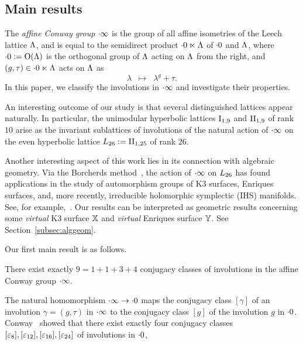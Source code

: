 \documentclass{amsart} %
\begin{document}
\subsection{Main results}
%
The \emph{affine Conway group} $\cdot \infty$ is the group of 
all affine isometries of the Leech lattice $\Lambda$,
and is equal to the semidirect product $\cdot 0 \ltimes \Lambda$
of $\cdot 0$ and $\Lambda$,
where $\cdot 0:=\mathord{\mathrm{O}}(\Lambda)$ is the orthogonal group of $\Lambda$
acting on $\Lambda$ from the right, and 
$(g, \tau)\in \cdot 0 \ltimes \Lambda$ acts on $\Lambda$ as
\[
\lambda\;\;\mapsto\;\; \lambda^g+\tau.
\]
In this paper,
we classify the involutions in $\cdot \infty$ and investigate their properties. 
\par
An interesting outcome of our study is that 
several distinguished lattices appear naturally. 
In particular, the unimodular hyperbolic lattices $\mathrm{I}_{1, 9}$ and $\mathrm{II}_{1, 9}$ of rank $10$
arise as the invariant sublattices of involutions of the natural action of $\cdot \infty$ on 
the even hyperbolic lattice $L_{26}:=\mathrm{II}_{1, 25}$ of rank $26$.                                                                                                                                                                                                                                                                                                    
\par
Another interesting aspect of this work lies in its connection with algebraic geometry. 
Via the Borcherds method~\cite{MR913200, MR1654763},
the action of $\cdot \infty$ on $L_{26}$
has found applications in the study of automorphism groups of K3 surfaces, 
Enriques surfaces, and, more recently, irreducible holomorphic symplectic (IHS) manifolds.
 See, for example,~\cite{MR4931809}.
 Our results can be interpreted as geometric results 
concerning some \emph{virtual} K3 surface $\mathord{\mathbb{X}}$ and \emph{virtual} Enriques surface $\mathord{\mathbb{Y}}$.
 See Section~\ref{subsec:alggeom}.
\par
Our first main result is as follows.
%
\begin{theorem}\label{thm:main1}
There exist exactly 
$9=1+1+3+4$
conjugacy classes of involutions in the affine Conway group $\cdot \infty$.
\end{theorem}
%
The natural homomorphism $\cdot \infty \to \cdot 0$ maps
the conjugacy class $[\gamma]$ of an involution $\gamma=(g, \tau)$
in $\cdot \infty$ to the conjugacy class $[g]$ of the involution $g$ in $\cdot 0$. 
Conway~\cite[Chapter 10,~Section 3.7]{theCSbook}
showed that there exist exactly four conjugacy classes
$[\varepsilon_8], [\varepsilon_{12}], [\varepsilon_{16}], [\varepsilon_{24}]$ of involutions in $\cdot 0$,
\end{document}
